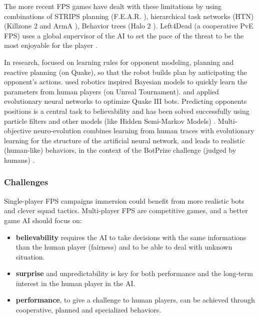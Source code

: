The more recent FPS games have dealt with these limitations by using combinations of STRIPS planning (F.E.A.R. \citep{orkinGDC_FEAR}), hierarchical task networks (HTN) (Killzone 2 \citep{Killzone2_HTN} and ArmA \citep{ArmA1_HTN}), Behavior trees (Halo 2 \citep{Isla}). Left4Dead (a cooperative PvE FPS) uses a global supervisor of the AI to set the pace of the threat to be the most enjoyable for the player \citep{left4dead2009}.%

In research, \citet{Laird01} focused on learning rules for opponent modeling, planning and reactive planning (on Quake), so that the robot builds plan by anticipating the opponent's actions. \citet{LeHy04,theseRonan} used robotics inspired Bayesian models to quickly learn the parameters from human players (on Unreal Tournament). \citet{Zanetti2004} and \citet{westraQ3} applied evolutionary neural networks to optimize Quake III bots. Predicting opponents positions is a central task to believability and has been solved successfully using particle filters \citep{particlefiltergameAI} and other models (like Hidden Semi-Markov Models) \citep{Hladky_anevaluation}. Multi-objective neuro-evolution \citep{Zanetti2004,schrum_cig11competition} combines learning from human traces with evolutionary learning for the structure of the artificial neural network, and leads to realistic (human-like) behaviors, in the context of the BotPrize challenge (judged by humans) \citep{Hingston_2009}.

\subsubsection{Challenges}

Single-player FPS campaigns immersion could benefit from more realistic bots and clever squad tactics. Multi-player FPS are competitive games, and a better game AI should focus on:
\begin{itemize}
    \item \textbf{believability} requires the AI to take decisions with the same informations than the human player (fairness) and to be able to deal with unknown situation.
    \item \textbf{surprise} and {unpredictability} is key for both performance and the long-term interest in the human player in the AI.
    \item \textbf{performance}, to give a challenge to human players, can be achieved through cooperative, planned and specialized behaviors.
\end{itemize}

